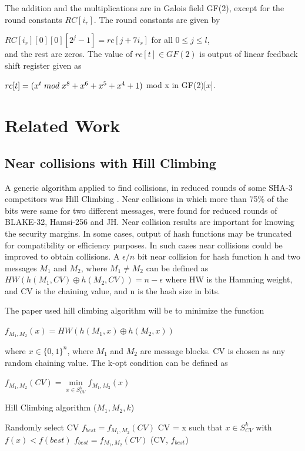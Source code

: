 \documentclass[12pt]{artikel3}                  %
\begin{document}
The addition and the multiplications are in Galois field GF(2), except for the round constants $RC[i_{r}]$. The round constants 
are given by

$RC[i_{r}][0][0][2^{j} - 1] = rc[j + 7i_{r}]$ for all $ 0 \leq j \leq l$, \\
and the rest are zeros. The value of $rc[t] \in GF(2)$ is output of linear feedback shift register given as 

$rc[t] = (x^{t} \thickspace mod \thickspace x^{8} + x^{6} + x^{5} + x^{4} + 1)$ mod x in GF(2)[$x$].

\section{Related Work}

\subsection{Near collisions with Hill Climbing}

A generic algorithm applied to find collisions, in reduced rounds of some SHA-3 competitors was Hill Climbing
\cite{00029}. Near collisions in which more than 75\% of the bits were same for two different messages, were found 
for reduced rounds of BLAKE-32, Hamsi-256 and JH. Near collision results are important for knowing the security
margins. In some cases, output of hash functions may be truncated for compatibility or efficiency purposes. In 
such cases near collisions could be improved to obtain collisions. A $\epsilon / n $ bit near collision for hash 
function h and two messages $M_{1}$ and $M_{2}$, where $M_{1} \neq M_{2}$ can be defined as
$HW( h( M_{1}, CV ) \oplus h( M_{2}, CV ) ) = n - \epsilon $ where HW is the Hamming weight, and CV is the chaining
value, and n is the hash size in bits.

The paper used hill climbing algorithm will be to minimize the function 

$f_{M_{1}, M_{2}}(x) = HW( h(M_{1}, x) \oplus h(M_{2}, x) )$

where $x \in \{0, 1\}^{n}$, where $M_{1}$ and $M_{2}$ are message blocks. CV is chosen as any random chaining value.
The k-opt condition can be defined as 

$f_{M_{1}, M_{2}} (CV) =  \min\limits_{x \in S^{k}_{CV}} f_{M_{1}, M_{2}} (x)$ 

\begin{algorithm}
  \caption{ Hill Climbing algorithm ($M_{1}, M_{2}, k$) }
  \begin{algorithmic}[1]
    \State Randomly select CV
    \State $f_{best} = f_{M_{1}, M_{2}}(CV)$
    \State {}
    \State CV = x such that $x \in S^{k}_{CV}$ with $f(x) < f(best)$
    \State $f_{best} = f_{M_{1}, M_{2}}(CV)$
    \State \EndWhile
    \State \Return (CV, $f_{best}$)
  \end{algorithmic}
\end{algorithm}
\end{document}
